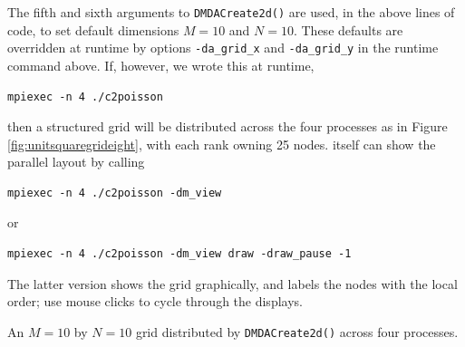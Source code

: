 The fifth and sixth arguments to \texttt{DMDACreate2d()} are used, in the above lines of code, to set default dimensions $M=10$ and $N=10$.  These defaults are overridden at runtime by options \texttt{-da\_grid\_x} and \texttt{-da\_grid\_y} in the runtime command above.  If, however, we wrote this at runtime,
 \begin{Verbatim}[fontsize=\small]
  mpiexec -n 4 ./c2poisson
\end{Verbatim}
then a structured grid will be distributed across the four processes as in Figure \ref{fig:unitsquaregrideight}, with each rank owning 25 nodes.  \PETSc itself can show the parallel layout by calling
\begin{Verbatim}[fontsize=\small]
  mpiexec -n 4 ./c2poisson -dm_view
\end{Verbatim}
or
\begin{Verbatim}[fontsize=\small]
  mpiexec -n 4 ./c2poisson -dm_view draw -draw_pause -1
\end{Verbatim}
The latter version shows the grid graphically, and labels the nodes with the local order; use mouse clicks to cycle through the displays.

\begin{marginfigure}
\caption{An $M=10$ by $N=10$ grid distributed by \texttt{DMDACreate2d()} across four \MPI processes.}
\label{fig:unitsquaregrideight}
\end{marginfigure}


